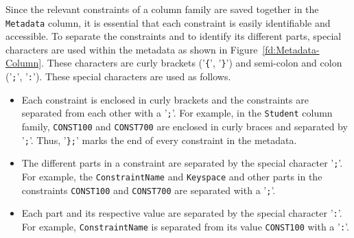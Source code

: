 Since the relevant constraints of a column family are saved
together in the \texttt{Metadata} column,  it is essential that each constraint
is easily identifiable and accessible.  To separate
the constraints and to identify its different parts, special characters are used
within the metadata as shown in Figure~\ref{fd:Metadata-Column}. These   
characters are curly brackets ('\texttt{\{}', '\texttt{\}}') and
semi-colon and colon ('\texttt{;}', '\texttt{:}'). These special characters are
used as follows. 



% 
% 


	
		\begin{itemize}
			\item Each constraint is enclosed in curly brackets and the
			constraints are separated from each other with a
			'\texttt{;}'.  For example, in the \texttt{Student} column
			family,  \texttt{CONST100} and \texttt{CONST700} are enclosed in curly braces
			and separated by '\texttt{;}'. 
			Thus,  '\texttt{\};}' marks the end of every constraint in the metadata. 
		
		
			\item The different parts in a constraint are separated by the special character
			'\texttt{;}'.  For example,  the \texttt{ConstraintName}
			and \texttt{Keyspace} and other parts in the constraints \texttt{CONST100} and
						 \texttt{CONST700} are separated with a '\texttt{;}'. 
			 
			 
			\item Each part and its respective value are separated by the special
			character '\texttt{:}'.  For example,  \texttt{ConstraintName} is separated from
			its value \texttt{CONST100} with a '\texttt{:}'.  
			
		\end{itemize}



